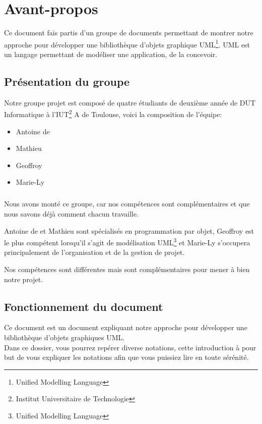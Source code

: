 \chapter*{Avant-propos}
Ce document fais partis d'un groupe de documents permettant de montrer notre approche pour développer une bibliothèque d'objets graphique 
UML\footnote{Unified Modelling Language}. UML est un langage permettant de modéliser une application, de la concevoir. 

\section*{Présentation du groupe}
	Notre groupe projet est composé de quatre étudiants de deuxième année de DUT Informatique à l'IUT\footnote{Institut Universitaire de Technologie} A de Toulouse, voici la composition de l'équipe: 
	\begin{itemize}
		\item Antoine de  
		\item Mathieu  
		\item Geoffroy 
		\item Marie-Ly  
	\end{itemize}
	\vspace{20px}
	\paragraph{}
	Nous avons monté ce groupe, car nos compétences sont complémentaires et que nous savons déjà comment chacun travaille.
	
	Antoine de  et Mathieu  sont spécialisés en programmation par objet, Geoffroy  est le plus compétent lorsqu'il s'agit de modélisation UML\footnote{Unified Modelling Language} et Marie-Ly  s'occupera principalement de l'organisation et de la gestion de projet. 

	Nos compétences sont différentes mais sont complémentaires pour mener à bien notre projet.
\section*{Fonctionnement du document}
Ce document est un document expliquant notre approche pour développer une bibliothèque d'objets graphiques UML.\\

Dans ce dossier, vous pourrez repérer diverse notations, cette introduction à pour but de vous expliquer les notations afin
que vous puissiez lire en toute sérénité.
